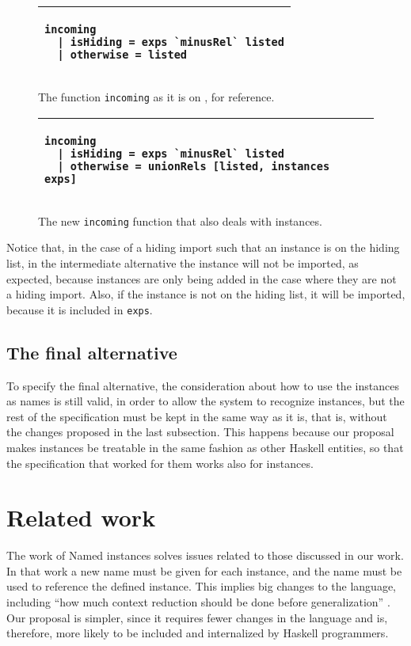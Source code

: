 \documentclass[msc]{ppgccufmg}
\begin{document}
\begin{figure}
\caption{The function \texttt{incoming} as it is on \citep[section
    5.3]{formal}, for reference.\label{old-incoming}}
\begin{tabular}{|p{\textwidth}|}
\hline
\begin{verbatim}
incoming
  | isHiding = exps `minusRel` listed
  | otherwise = listed
\end{verbatim}
\\
\hline
\end{tabular}
\end{figure}

\begin{figure}
\caption{The new \texttt{incoming} function that also deals with
  instances.\label{new-incoming}}
\begin{tabular}{|p{\textwidth}|}
\hline
\begin{verbatim}
incoming
  | isHiding = exps `minusRel` listed
  | otherwise = unionRels [listed, instances exps]
\end{verbatim}
\\
\hline
\end{tabular}
\end{figure}

Notice that, in the case of a hiding import such that an instance is
on the hiding list, in the intermediate alternative the instance will
not be imported, as expected, because instances are only being added
in the case where they are not a hiding import.  Also, if the instance
is not on the hiding list, it will be imported, because it is included
in \texttt{exps}.

\section{The final alternative}
To specify the final alternative, the consideration about how to use the
instances as names is still valid, in order to allow the system to recognize
instances, but the
rest of the specification must be kept in the same way as it is, that is, without
the changes proposed in the last subsection.  This happens because our proposal
makes instances be treatable in the same fashion as other Haskell entities, so
that the specification that worked for them works also for instances.

\chapter{Related work}
\label{related}
The work of Named instances \citep{named} solves issues related to those
discussed in our work.  In that work a new name must be given for each instance,
and the name must be used to reference the defined instance.  This implies big changes to the
language, including ``how much context reduction should be done before
generalization'' \citep[p.~8]{tc}.  Our proposal is simpler, since it requires fewer
changes in the language and is, therefore, more likely to be included and
internalized by Haskell programmers.
\end{document}
